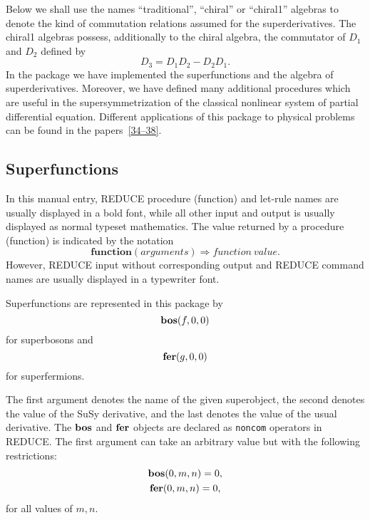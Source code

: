 {Below we shall use the names ``traditional'', ``chiral'' or
``chiral1'' algebras to denote the kind of commutation relations
assumed for the superderivatives.  The chiral1 algebras possess,
additionally to the chiral algebra, the commutator of $D_{1}$ and
$D_{2}$ defined by
\begin{equation*}
  D_{3} = D_{1} D_{2} -D_{2} D_{1}.
\end{equation*}
In the  package we have implemented the superfunctions
and the algebra of superderivatives.  Moreover, we have defined many
additional procedures which are useful in the supersymmetrization of
the classical nonlinear system of partial differential equation.
Different applications of this package to physical problems can be
found in the papers~\hyperref[susy2-bib]{[34--38]}.

\subsection{Superfunctions}

In this manual entry, REDUCE procedure (function) and let-rule names
are usually displayed in a bold font, while all other input and output
is usually displayed as normal typeset mathematics.  The value
returned by a procedure (function) is indicated by the notation
\begin{equation*}
  \mathbf{function}(\mathit{arguments}) \Rightarrow
  \mathit{function~value}.
\end{equation*}
However, REDUCE input without corresponding output and REDUCE command
names are usually displayed in a typewriter font.

Superfunctions are represented in this package by
\begin{equation}\label{susy2-eqn1}
  \mathbf{bos}(f,0,0)
\end{equation}
for superbosons and
\begin{equation*}
  \mathbf{fer}(g,0,0)
\end{equation*}
for superfermions.

The first argument denotes the name of the given superobject, the
second denotes the value of the SuSy derivative, and the last denotes
the value of the usual derivative.  The $\mathbf{bos}$ and
$\mathbf{fer}$ objects are declared as \texttt{noncom} operators in
REDUCE\@.  The first argument can take an arbitrary value but with the
following restrictions:
\begin{gather*}
  \mathbf{bos}(0,m,n) = 0, \\
  \mathbf{fer}(0,m,n) = 0,
\end{gather*}
for all values of $m,n$.

}
